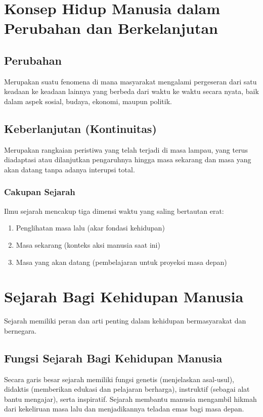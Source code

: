 \documentclass[12pt, a4paper]{article}
\begin{document}
\section{Konsep Hidup Manusia dalam Perubahan dan Berkelanjutan}
\subsection{Perubahan}
Merupakan suatu fenomena di mana masyarakat mengalami pergeseran dari satu keadaan ke keadaan lainnya yang berbeda dari waktu ke waktu secara nyata, baik dalam aspek sosial, budaya, ekonomi, maupun politik.

\subsection{Keberlanjutan (Kontinuitas)}
Merupakan rangkaian peristiwa yang telah terjadi di masa lampau, yang terus diadaptasi atau dilanjutkan pengaruhnya hingga masa sekarang dan masa yang akan datang tanpa adanya interupsi total.

\subsubsection{Cakupan Sejarah}
Ilmu sejarah mencakup tiga dimensi waktu yang saling bertautan erat:
\begin{enumerate}
	\item Penglihatan masa lalu (akar fondasi kehidupan)
	\item Masa sekarang (konteks aksi manusia saat ini)
	\item Masa yang akan datang (pembelajaran untuk proyeksi masa depan)
\end{enumerate}

\section{Sejarah Bagi Kehidupan Manusia}
Sejarah memiliki peran dan arti penting dalam kehidupan bermasyarakat dan bernegara.
\subsection{Fungsi Sejarah Bagi Kehidupan Manusia}
Secara garis besar sejarah memiliki fungsi genetis (menjelaskan asal-usul), didaktis (memberikan edukasi dan pelajaran berharga), instruktif (sebagai alat bantu mengajar), serta inspiratif. Sejarah membantu manusia mengambil hikmah dari kekeliruan masa lalu dan menjadikannya teladan emas bagi masa depan.
\end{document}
